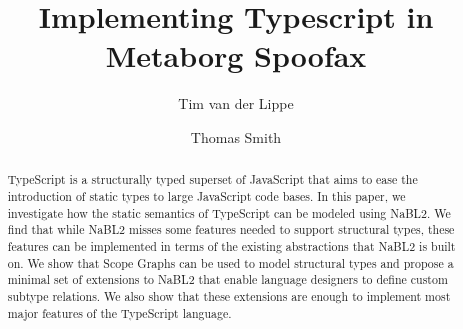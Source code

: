 \documentclass[sigplan,10pt]{acmart}\settopmatter{printfolios=true}
\begin{document}
\title[Metaborg Typescript]{Implementing Typescript in Metaborg Spoofax}         %

\author{Tim van der Lippe}

\author{Thomas Smith}

\begin{abstract}
TypeScript is a structurally typed superset of JavaScript that aims to ease the introduction of static types
to large JavaScript code bases. In this paper, we investigate how the static semantics of TypeScript can be
modeled using NaBL2. We find that while NaBL2 misses some features needed to support structural types, 
these features can be implemented in terms of the existing abstractions that NaBL2 is built on.
We show that Scope Graphs can be used to model structural types and propose a minimal set of extensions
to NaBL2 that enable language designers to define custom subtype relations. We also show that these extensions
are enough to implement most major features of the TypeScript language.
\end{abstract}



\maketitle










\end{document}
